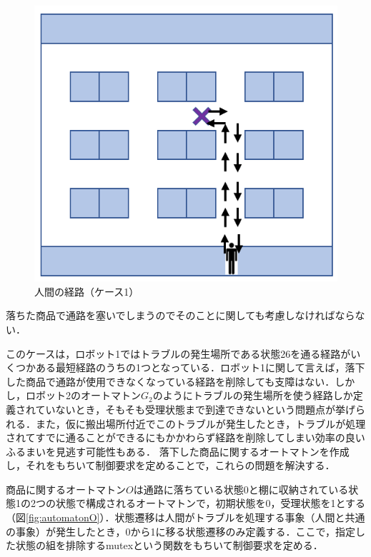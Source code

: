 \begin{figure}[!t]
    \centering
    \includegraphics[scale=0.35]{figures/HITL1_case1_H.png}
    \caption{人間の経路（ケース1）}
    \label{fig:HITL1_case1_H}
\end{figure}

落ちた商品で通路を塞いでしまうのでそのことに関しても考慮しなければならない．

このケースは，ロボット1ではトラブルの発生場所である状態26を通る経路がいくつかある最短経路のうちの1つとなっている．ロボット1に関して言えば，落下した商品で通路が使用できなくなっている経路を削除しても支障はない．しかし，ロボット2のオートマトン$G_2$のようにトラブルの発生場所を使う経路しか定義されていないとき，そもそも受理状態まで到達できないという問題点が挙げられる．また，仮に搬出場所付近でこのトラブルが発生したとき，トラブルが処理されてすでに通ることができるにもかかわらず経路を削除してしまい効率の良いふるまいを見逃す可能性もある．
落下した商品に関するオートマトンを作成し，それをもちいて制御要求を定めることで，これらの問題を解決する．

商品に関するオートマトン$O$は通路に落ちている状態0と棚に収納されている状態1の2つの状態で構成されるオートマトンで，初期状態を0，受理状態を1とする（図\ref{fig:automatonO}）．状態遷移は人間がトラブルを処理する事象（人間と共通の事象）が発生したとき，0から1に移る状態遷移のみ定義する．ここで，指定した状態の組を排除するmutexという関数をもちいて制御要求を定める．

